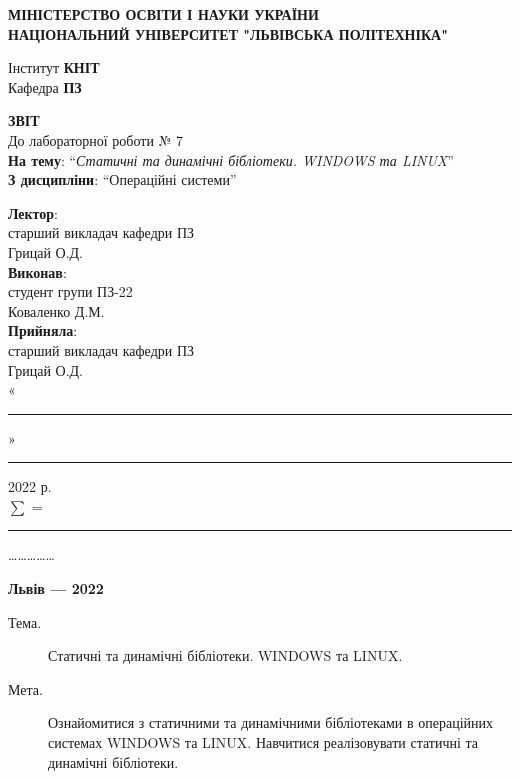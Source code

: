 \documentclass{article}
\newcommand\subject{Операційні системи}
\newcommand\lecturer{старший викладач кафедри ПЗ\\Грицай О.Д.}
\newcommand\teacher{старший викладач кафедри ПЗ\\Грицай О.Д.}
\newcommand\mygroup{ПЗ-22}
\newcommand\lab{7}
\newcommand\theme{Статичні та динамічні бібліотеки. WINDOWS та LINUX}
\newcommand\purpose{Ознайомитися з статичними та динамічними бібліотеками в операційних
	системах WINDOWS та LINUX. Навчитися реалізовувати статичні та динамічні
	бібліотеки}
\begin{document}
\begin{normalsize}
	\begin{titlepage}
		\thispagestyle{empty}
		\begin{center}
			\textbf{МІНІСТЕРСТВО ОСВІТИ І НАУКИ УКРАЇНИ\\
				НАЦІОНАЛЬНИЙ УНІВЕРСИТЕТ "ЛЬВІВСЬКА ПОЛІТЕХНІКА"}
		\end{center}
		\begin{flushright}
			Інститут \textbf{КНІТ}\\
			Кафедра \textbf{ПЗ}
		\end{flushright}
		\vspace{200pt}
		\begin{center}
			\textbf{ЗВІТ}\\
			\vspace{10pt}
			До лабораторної роботи № \lab\\
			\textbf{На тему}: “\textit{\theme}”\\
			\textbf{З дисципліни}: “\subject”
		\end{center}
		\vspace{112pt}
		\begin{flushright}
			
			\textbf{Лектор}:\\
			\lecturer\\
			\vspace{28pt}
			\textbf{Виконав}:\\
			
			студент групи \mygroup\\
			Коваленко Д.М.\\
			\vspace{28pt}
			\textbf{Прийняла}:\\
			
			\teacher\\
			
			\vspace{28pt}
			«\rule{1cm}{0.15mm}» \rule{1.5cm}{0.15mm} 2022 р.\\
			$\sum$ = \rule{1cm}{0.15mm}……………\\
			
		\end{flushright}
		\vspace{\fill}
		\begin{center}
			\textbf{Львів — 2022}
		\end{center}
	\end{titlepage}
		
	\begin{description}
		\item[Тема.] \theme.
		\item[Мета.] \purpose.
	\end{description}


\end{normalsize}
\end{document}
